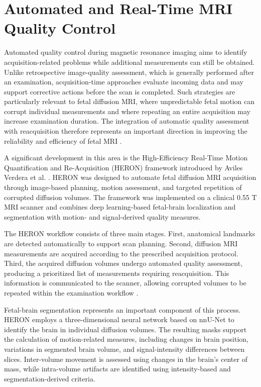 \section{Automated and Real-Time MRI Quality Control}

Automated quality control during magnetic resonance imaging aims to identify acquisition-related problems while additional measurements can still be obtained. Unlike retrospective image-quality assessment, which is generally performed after an examination, acquisition-time approaches evaluate incoming data and may support corrective actions before the scan is completed. Such strategies are particularly relevant to fetal diffusion MRI, where unpredictable fetal motion can corrupt individual measurements and where repeating an entire acquisition may increase examination duration. The integration of automatic quality assessment with reacquisition therefore represents an important direction in improving the reliability and efficiency of fetal MRI \autocite{avilesverdera2025heron}.

A significant development in this area is the High-Efficiency Real-Time Motion Quantification and Re-Acquisition (HERON) framework introduced by Aviles Verdera et al. \autocite{avilesverdera2025heron}. HERON was designed to automate fetal diffusion MRI acquisition through image-based planning, motion assessment, and targeted repetition of corrupted diffusion volumes. The framework was implemented on a clinical 0.55 T MRI scanner and combines deep learning-based fetal-brain localization and segmentation with motion- and signal-derived quality measures.

The HERON workflow consists of three main stages. First, anatomical landmarks are detected automatically to support scan planning. Second, diffusion MRI measurements are acquired according to the prescribed acquisition protocol. Third, the acquired diffusion volumes undergo automated quality assessment, producing a prioritized list of measurements requiring reacquisition. This information is communicated to the scanner, allowing corrupted volumes to be repeated within the examination workflow \autocite{avilesverdera2025heron}.

Fetal-brain segmentation represents an important component of this process. HERON employs a three-dimensional neural network based on nnU-Net to identify the brain in individual diffusion volumes. The resulting masks support the calculation of motion-related measures, including changes in brain position, variations in segmented brain volume, and signal-intensity differences between slices. Inter-volume movement is assessed using changes in the brain's center of mass, while intra-volume artifacts are identified using intensity-based and segmentation-derived criteria.

